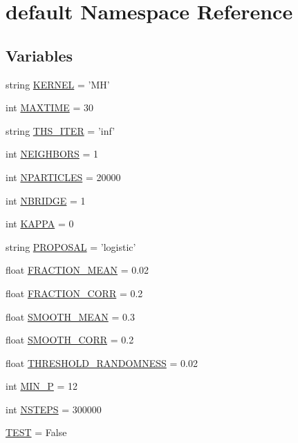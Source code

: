 \hypertarget{namespacedefault}{
\section{default Namespace Reference}
\label{namespacedefault}
}
\subsection*{Variables}
\begin{CompactItemize}
\item 
string \hyperlink{namespacedefault_0c31828afc488101f96b519cb1cc97a4}{KERNEL} = 'MH'
\item 
int \hyperlink{namespacedefault_db3632d348cbdfb3166f68e74436e88a}{MAXTIME} = 30
\item 
string \hyperlink{namespacedefault_25dbe07c88b53f5e3d634a41030abc92}{THS\_\-ITER} = 'inf'
\item 
int \hyperlink{namespacedefault_e13d6e2cfb0c69b63bf1b94dc7b89f33}{NEIGHBORS} = 1
\item 
int \hyperlink{namespacedefault_a86f89a12973ba89585f8d3bf80e39bb}{NPARTICLES} = 20000
\item 
int \hyperlink{namespacedefault_f01f9265706877b864e148aa2497d491}{NBRIDGE} = 1
\item 
int \hyperlink{namespacedefault_2def7e326b1fcf05090331eb05eb87f0}{KAPPA} = 0
\item 
string \hyperlink{namespacedefault_011365b6827b95abcd94e942b9634033}{PROPOSAL} = 'logistic'
\item 
float \hyperlink{namespacedefault_b4c0f28797b1b7456f058a25d23f1b54}{FRACTION\_\-MEAN} = 0.02
\item 
float \hyperlink{namespacedefault_43dd32dbb17b845bfcdaf6c00b63388e}{FRACTION\_\-CORR} = 0.2
\item 
float \hyperlink{namespacedefault_f6f2749b29850745ee984eab37b6ff02}{SMOOTH\_\-MEAN} = 0.3
\item 
float \hyperlink{namespacedefault_76a017cb874d74e81d5094a72f1c52a6}{SMOOTH\_\-CORR} = 0.2
\item 
float \hyperlink{namespacedefault_6824ae496ae216b60d5f134a9bb0aaea}{THRESHOLD\_\-RANDOMNESS} = 0.02
\item 
int \hyperlink{namespacedefault_6ed59fbe2b196fcc3ae1a6b604276d6f}{MIN\_\-P} = 12
\item 
int \hyperlink{namespacedefault_d8fe4498e40472b3484b47a9b8f9b4f4}{NSTEPS} = 300000
\item 
\hyperlink{namespacedefault_9b628d43cf39c122618124e250f484d4}{TEST} = False

\end{CompactItemize}
